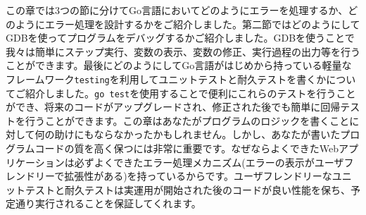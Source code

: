 この章では3つの節に分けてGo言語においてどのようにエラーを処理するか、どのようにエラー処理を設計するかをご紹介しました。第二節ではどのようにしてGDBを使ってプログラムをデバッグするかご紹介しました。GDBを使うことで我々は簡単にステップ実行、変数の表示、変数の修正、実行過程の出力等を行うことができます。最後にどのようにしてGo言語がはじめから持っている軽量なフレームワーク\texttt{testing}を利用してユニットテストと耐久テストを書くかについてご紹介しました。\texttt{go test}を使用することで便利にこれらのテストを行うことができ、将来のコードがアップグレードされ、修正された後でも簡単に回帰テストを行うことができます。この章はあなたがプログラムのロジックを書くことに対して何の助けにもならなかったかもしれません。しかし、あなたが書いたプログラムコードの質を高く保つには非常に重要です。なぜならよくできたWebアプリケーションは必ずよくできたエラー処理メカニズム(エラーの表示がユーザフレンドリーで拡張性がある)を持っているからです。ユーザフレンドリーなユニットテストと耐久テストは実運用が開始された後のコードが良い性能を保ち、予定通り実行されることを保証してくれます。
